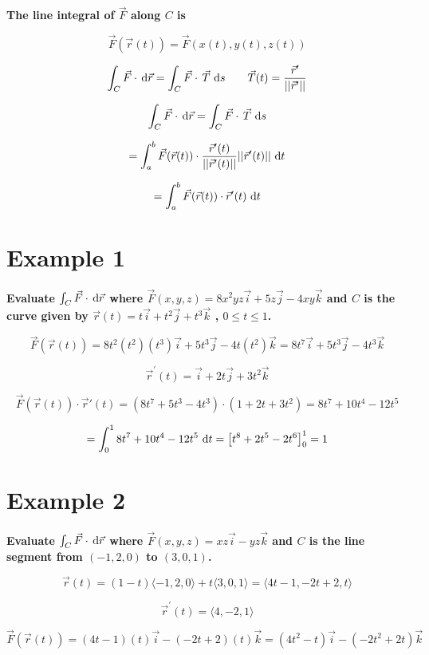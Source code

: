 \documentclass{scrartcl}
\DeclareRobustCommand*\d
{\ifmmode\mathop{}\!\mathrm{d}\else\expandafter\originald\fi}
\begin{document}
	
\textbf{The line integral of $\vec{F}$ along $C$ is}

\text{$\int_{C}^{} \vec{F} \cdot \, \d \vec{r} = \int_{a}^{b}
\vec{F}(\vec{r}(t)) \cdot \vec{r}^{\prime} \, \d t$}

\[\vec{F}(\vec{r}(t)) = \vec{F}(x(t),y(t),z(t)) \]

\[\int_{C}^{} \vec{F} \cdot \, \d \vec{r} = \int_{C}^{} \vec{F} \cdot \,\vec{T} \, \d s  \qquad \vec{T}(t) = \frac{\vec{r}^{\prime}}{||\vec{r}^{\prime}||}\]

\[\int_{C}^{} \vec{F} \cdot \, \d \vec{r} = \int_{C}^{} \vec{F} \cdot \,\vec{T} \, \d s \]

\[=\int_{a}^{b}\vec{F} (\vec{r}(t)) \cdot \frac{\vec{r}^{\prime}(t)}{||\vec{r}^{\prime}(t)||} ||\vec{r}^{\prime}(t)||\, \d t\]

\[=\int_{a}^{b}\vec{F} (\vec{r}(t)) \cdot \vec{r}^{\prime}(t)\, \d t \]

\section*{Example 1}

\textbf{Evaluate $\int_{C}^{} \vec{F} \cdot \, \d \vec{r}$ where $\vec{F}(x,y,z)=8x^2yz\vec{i}+5z\vec{j}-4xy\vec{k}$ and $C$ is the curve given by $\vec{r}(t)=t\vec{i}+t^2\vec{j}+t^3\vec{k}$ , $0 \leq t \leq1$.}

\[\vec{F}(\vec{r}(t))= 8t^2(t^2)(t^3)\vec{i}+5t^3\vec{j}-4t(t^2)\vec{k}=8t^7\vec{i}+5t^3\vec{j}-4t^3\vec{k}\]

\[\vec{r}^{\prime}(t)=\vec{i}+2t\vec{j}+3t^2\vec{k}\]

\[\vec{F}(\vec{r}(t))\cdot \vec{r}{\prime}(t) =(8t^7+5t^3-4t^3) \cdot (1+2t+3t^2) = 8t^7+10t^4-12t^5\]

\[=\int_{0}^{1} 8t^7+10t^4-12t^5\, \d t =\left[t^8+2t^5-2t^6\right]_{0}^{1}=1\]

\section*{Example 2}

\textbf{Evaluate $\int_{C}^{} \vec{F} \cdot \, \d \vec{r}$ where $\vec{F}(x,y,z)=xz\vec{i}-yz\vec{k}$ and $C$ is the line segment from $(-1,2,0)$ to $(3,0,1)$.}

\[\vec{r}(t)=(1-t)\langle-1,2,0\rangle +t\langle 3,0,1\rangle=\langle4t-1,-2t+2,t\rangle\]

\[\vec{r}^{\prime}(t)=\langle 4,-2,1\rangle\]

\[\vec{F}(\vec{r}(t))= (4t-1)(t)\vec{i}-(-2t+2)(t)\vec{k}=(4t^2-t)\vec{i}-(-2t^2+2t)\vec{k}\]
\end{document}
